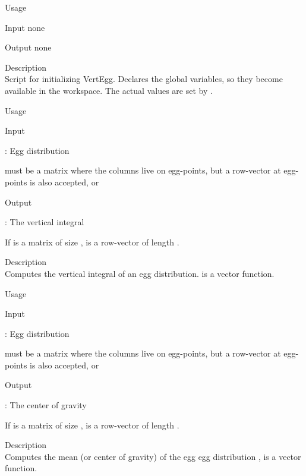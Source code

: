 {

\begin{tdesc}
\item[Usage] 
\item[Input] none
\item[Output] none
\item[Description]\mbox{}\\
  Script for initializing VertEgg.
  Declares the global variables, so they become
  available in the workspace.
  The actual values are set by .
\end{tdesc}


\begin{tdesc}
\item[Usage] 
\item[Input]
  \begin{vartab}
   \>  : \> Egg distribution  \>  [eggs/m$^3$]
  \end{vartab}
   must be a matrix where the columns live on egg-points,
  but a row-vector at egg-points is also accepted,
   or 
\item[Output]
  \begin{vartab}
      \>  : \> The vertical integral \>  [eggs/m$^2$]
  \end{vartab}
  If  is a matrix of size ,  is a
  row-vector of length .
\item[Description]\mbox{}\\
  Computes the vertical integral of an egg distribution.
   is a vector function.
\end{tdesc}



\begin{tdesc}
\item[Usage] 
\item[Input]
  \begin{vartab}
    \> :\>  Egg distribution   \>  [eggs/m$^3$]
  \end{vartab}
   must be a matrix where the columns live on egg-points,
  but a row-vector at egg-points is also accepted,
   or 
\item[Output]
  \begin{vartab}
     \> : \> The center of gravity \>  [m] 
  \end{vartab}
  If  is a matrix of size ,  is a
  row-vector of length .
\item[Description]\mbox{}\\
  Computes the mean (or center of gravity) of the egg
  egg distribution ,
   is a vector function.
\end{tdesc}


}

